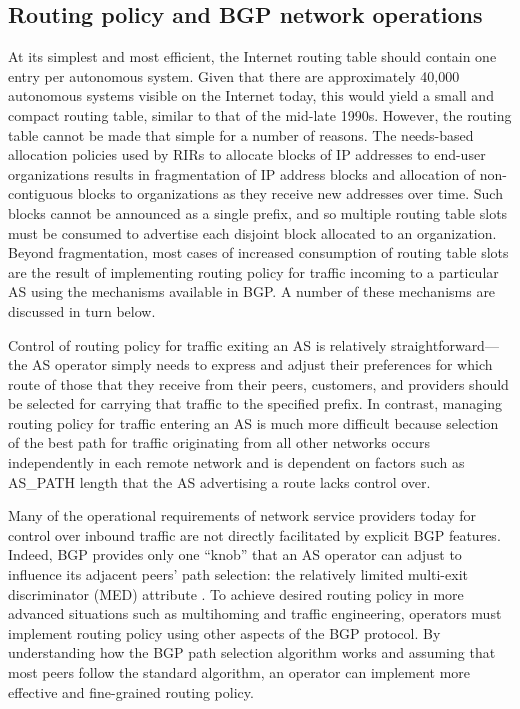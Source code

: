 \subsection{Routing policy and BGP network operations}

At its simplest and most efficient, the Internet routing table should contain
one entry per autonomous system. Given that there are approximately 40,000
autonomous systems visible on the Internet today, this would yield a small and
compact routing table, similar to that of the mid-late 1990s. However, the
routing table cannot be made that simple for a number of reasons. The
needs-based allocation policies used by RIRs \cite{rfc2050} to allocate blocks
of IP addresses to end-user organizations results in fragmentation of IP
address blocks and allocation of non-contiguous blocks to organizations as they
receive new addresses over time. Such blocks cannot be announced as a single
prefix, and so multiple routing table slots must be consumed to advertise each
disjoint block allocated to an organization. Beyond fragmentation, most cases
of increased consumption of routing table slots are the result of implementing
routing policy for traffic incoming to a particular AS using the mechanisms
available in BGP. A number of these mechanisms are discussed in turn below.

Control of routing policy for traffic exiting an AS is relatively
straightforward---the AS operator simply needs to express and adjust their
preferences for which route of those that they receive from their peers,
customers, and providers should be selected for carrying that traffic to the
specified prefix. In contrast, managing routing policy for traffic entering an
AS is much more difficult because selection of the best path for traffic
originating from all other networks occurs independently in each remote network
and is dependent on factors such as AS\_PATH length that the AS advertising a
route lacks control over.

Many of the operational requirements of network service providers today
for control over inbound traffic are not directly facilitated by explicit
BGP features. Indeed, BGP provides only one ``knob'' that an AS operator can
adjust to influence its adjacent peers' path selection: the relatively limited
multi-exit discriminator (MED) attribute \cite{Beijnum:2002oq}. To achieve
desired routing policy in more advanced situations such as multihoming and
traffic engineering, operators must implement routing policy using other
aspects of the BGP protocol. By understanding how the BGP path selection
algorithm works and assuming that most peers follow the standard algorithm, an
operator can implement more effective and fine-grained routing policy.

